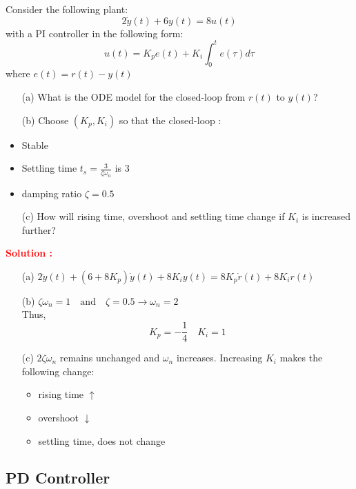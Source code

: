 \documentclass[12pt]{article}
\begin{document}
Consider the following plant:
\begin{equation}
    2\dot{y}(t) + 6y(t) = 8 u(t)
\end{equation}
with a PI controller in the following form:
\begin{equation}
    u(t) = K_p e(t) + K_i \int_0^t e(\tau) d\tau
\end{equation}
where \(e(t) = r(t) - y(t)\)
\begin{itemize}
    \item[(a)] What is the ODE model for the closed-loop from \(r(t)\) to \(y(t)\)?
    \item[(b)] Choose \((K_p,K_i)\) so that the closed-loop :
    \item Stable
    \item Settling time \(t_s = \frac{3}{\zeta \omega_n}\) is \(3\)
    \item damping ratio \(\zeta = 0.5\)
    \item[(c)] How will rising time, overshoot and settling time change if \(K_i\) is increased further?
\end{itemize}
\textbf{\textcolor{red}{Solution :}} 
\begin{itemize}
    \item[(a)] \(2\ddot{y}(t) + (6 + 8 K_p) \dot{y}(t) + 8 K_i y(t) = 8 K_p \dot{r}(t) + 8 K_i r(t) \)
    \item[(b)] \(\zeta \omega_n = 1 \quad \text{and} \quad \zeta = 0.5 \rightarrow \omega_n = 2\) \\
    Thus,
    \begin{equation}
        K_p = - \frac{1}{4} \quad K_i = 1
    \end{equation}
    \item[(c)] \(2\zeta \omega_n\) remains unchanged and \(\omega_n\) increases.
    Increasing \(K_i\) makes the following change:
    \begin{itemize}
        \item rising time \(\uparrow\)
        \item overshoot \(\downarrow\)
        \item settling time, does not change
    \end{itemize}
\end{itemize}

\clearpage
\subsection{PD Controller}
\end{document}
